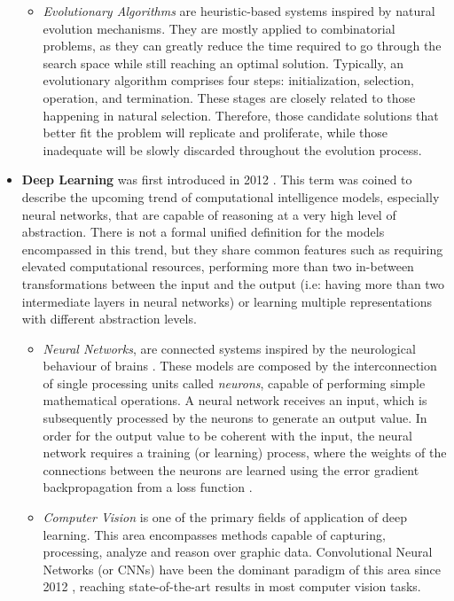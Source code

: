 \begin{itemize}
\begin{itemize}
        \item \textit{Evolutionary Algorithms} \citep{GALVAN2003573} are heuristic-based systems inspired by natural evolution mechanisms. They are mostly applied to combinatorial problems, as they can greatly reduce the time required to go through the search space while still reaching an optimal solution. Typically, an evolutionary algorithm comprises four steps: initialization, selection, operation, and termination. These stages are closely related to those happening in natural selection. Therefore, those candidate solutions that better fit the problem will replicate and proliferate, while those inadequate will be slowly discarded throughout the evolution process. 
    \end{itemize}
    \item \textbf{Deep Learning} was first introduced in 2012 \citep{bengio_2012_dl_review}. This term was coined to describe the upcoming trend of computational intelligence models, especially neural networks, that are capable of reasoning at a very high level of abstraction. There is not a formal unified definition for the models encompassed in this trend, but they share common features such as requiring elevated computational resources, performing more than two in-between transformations between the input and the output (i.e: having more than two intermediate layers in neural networks) or learning multiple representations with different abstraction levels.
    \begin{itemize}
        \item \textit{Neural Networks}, are connected systems inspired by the neurological behaviour of brains \citep{Rosenblatt58theperceptron:}. These models are composed by the interconnection of single processing units called \textit{neurons}, capable of performing simple mathematical operations. A neural network receives an input, which is subsequently processed by the neurons to generate an output value. In order for the output value to be coherent with the input, the neural network requires a training (or learning) process, where the weights of the connections between the neurons are learned using the error gradient backpropagation from a loss function \citep{rumelhart_1987_backpropagation}.  
        
        \item \textit{Computer Vision} is one of the primary fields of application of deep learning. This area encompasses methods capable of capturing, processing, analyze and reason over graphic data. Convolutional Neural Networks (or CNNs) have been the dominant paradigm of this area since 2012 \citep{alexnet}, reaching state-of-the-art results in most computer vision tasks.
        

\end{itemize}
\end{itemize}
